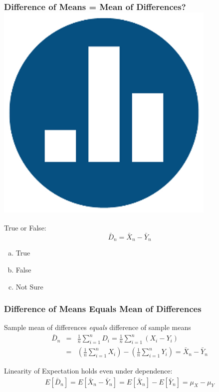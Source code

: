 \documentclass[handout]{beamer}
\begin{document}
\begin{frame}
\frametitle{Difference of Means = Mean of Differences?\hfill \includegraphics[scale = 0.05]{./images/clicker}}

True or False:
	$$\bar{D}_n = \bar{X}_n - \bar{Y}_n$$

\begin{enumerate}[(a)]
	\item True
	\item False
	\item Not Sure
\end{enumerate}

\end{frame}
\begin{frame}
\frametitle{Difference of Means Equals Mean of Differences}

\vspace{1em}
\alert{Sample mean of differences \emph{equals} difference of sample means}
\begin{eqnarray*}
	\bar{D}_n &=& \frac{1}{n}\sum_{i=1}^n D_i = \frac{1}{n}\sum_{i=1}^n (X_i - Y_i)\\
	& =& \left(\frac{1}{n}\sum_{i=1}^n X_i \right)- \left(\frac{1}{n}\sum_{i=1}^n Y_i \right)= \bar{X}_n - \bar{Y}_n
\end{eqnarray*}



\vspace{2em}

\alert{Linearity of Expectation holds even under dependence:}
\begin{eqnarray*}
	E[\bar{D}_n] = E[\bar{X}_n - \bar{Y}_n] = E[\bar{X}_n] - E[\bar{Y}_n] = \mu_X - \mu_Y
\end{eqnarray*}


\end{frame}
\end{document}
